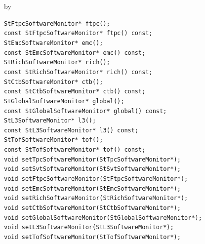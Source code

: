 \documentclass[twoside]{article}
\newcommand{\entrylabel}[1]{\mbox{\textbf{{#1}}}\hfil}%
\newenvironment{entry}
{\begin{list}{}%
    {\renewcommand{\makelabel}{\entrylabel}%
     \setlength{\labelwidth}{90pt}%
     \setlength{\leftmargin}{\labelwidth}
     \advance\leftmargin by \labelsep%
      }%
    }%
  {\end{list}}
\newcommand{\Entrylabel}[1]%
{\raisebox{0pt}[1ex][0pt]{\makebox[\labelwidth][l]%
    {\parbox[t]{\labelwidth}{\hspace{0pt}\textbf{{#1}}}}}}
\newenvironment{Entry}%
{\renewcommand{\entrylabel}{\Entrylabel}\begin{entry}}%
  {\end{entry}}
\begin{document}
\begin{Entry}
    \verb+StFtpcSoftwareMonitor* ftpc();+\\
    \verb+const StFtpcSoftwareMonitor* ftpc() const;+\\
    \verb+StEmcSoftwareMonitor* emc();+\\
    \verb+const StEmcSoftwareMonitor* emc() const;+\\
    \verb+StRichSoftwareMonitor* rich();+\\
    \verb+const StRichSoftwareMonitor* rich() const;+\\
    \verb+StCtbSoftwareMonitor* ctb();+\\
    \verb+const StCtbSoftwareMonitor* ctb() const;+\\
    \verb+StGlobalSoftwareMonitor* global();+\\
    \verb+const StGlobalSoftwareMonitor* global() const;+\\
    \verb+StL3SoftwareMonitor* l3();+\\
    \verb+const StL3SoftwareMonitor* l3() const;+\\
    \verb+StTofSoftwareMonitor* tof();+\\
    \verb+const StTofSoftwareMonitor* tof() const;+\\

    \verb+void setTpcSoftwareMonitor(StTpcSoftwareMonitor*);+\\
    \verb+void setSvtSoftwareMonitor(StSvtSoftwareMonitor*);+\\
    \verb+void setFtpcSoftwareMonitor(StFtpcSoftwareMonitor*);+\\
    \verb+void setEmcSoftwareMonitor(StEmcSoftwareMonitor*);+\\
    \verb+void setRichSoftwareMonitor(StRichSoftwareMonitor*);+\\
    \verb+void setCtbSoftwareMonitor(StCtbSoftwareMonitor*);+\\
    \verb+void setGlobalSoftwareMonitor(StGlobalSoftwareMonitor*);+\\
    \verb+void setL3SoftwareMonitor(StL3SoftwareMonitor*);+\\
    \verb+void setTofSoftwareMonitor(StTofSoftwareMonitor*);+\\
\end{Entry}
\clearpage
\end{document}
